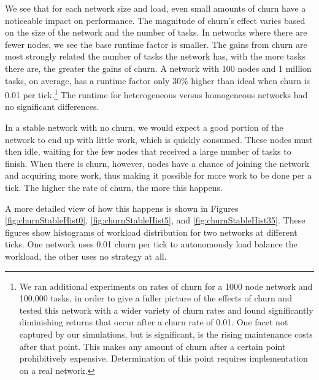 \documentclass[10pt,conference]{IEEEtran}
\begin{document}
	We see that for each network size and load, even small amounts of churn have a noticeable impact on performance.
	The magnitude of churn's effect varies based on the size of the network and the number of tasks.
	In networks where there are fewer nodes, we see the base runtime factor is smaller.
	The gains from churn are most strongly related the number of tasks the network has, with the more tasks there are, the greater the gains of churn.
	A network with 100 nodes and 1 million tasks, on average, has a runtime factor only 30\% higher than ideal when churn is 0.01 per tick.\footnote{We ran additional experiments on rates of churn for a 1000 node network and 100,000 tasks, in order to give a fuller picture of the effects of churn and tested this network with a wider variety of churn rates and found significantly diminishing returns that occur after a churn rate of 0.01.
		One facet not captured by our simulations, but is significant, is the rising maintenance costs after that point.
		This makes any amount of churn after a certain point prohibitively expensive.
		Determination of this point requires implementation on a real network.}
	The runtime for heterogeneous versus homogeneous networks had no significant differences.
	
	

	
	

	

	In a stable network with no churn, we would expect a good portion of the network to end up with little work, which is quickly consumed.
	These nodes must then idle, waiting for the few nodes that received a large number of tasks to finish.
	When there is churn, however, nodes have a chance of joining the network and acquiring more work, thus making it possible for more work to be done per a tick.
	The higher the rate of churn, the more this happens.
	
%	
	
	
	A more detailed view of how this happens is shown in Figures \ref{fig:churnStableHist0}, \ref{fig:churnStableHist5}, and \ref{fig:churnStableHist35}.
	These figures show histograms of workload distribution for two networks at different ticks.
	One network uses 0.01 churn per tick to autonomously load balance the workload, the other uses no strategy at all.
	
\end{document}
